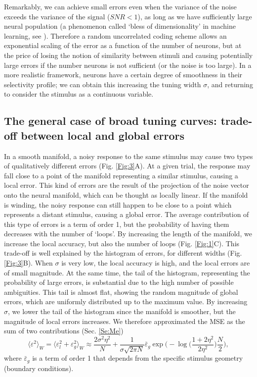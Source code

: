 \documentclass[a4paper]{article}
\begin{document}
Remarkably, we can achieve small errors even when the variance of the noise exceeds the variance of the signal ($SNR <1$), as long as we have sufficiently large neural population (a phenomenon called `bless of dimensionality' in machine learning, see \cite{Donoho2000High-dimensionalDimensionality}).
Therefore a random uncorrelated coding scheme  allows an exponential scaling of the error as a function of the number of neurons, but at the price of losing the notion of similarity between stimuli and causing potentially large errors if the number neurons is not sufficient (or the noise is too large). In a more realistic framework, neurons have a certain degree of smoothness in their selectivity profile; we can obtain this increasing the tuning width $\sigma$, and returning to consider the stimulus as a continuous variable.
\subsection{The general case of broad tuning curves: trade-off between local and global errors}



In a smooth manifold, a noisy response to the same stimulus may cause two types of qualitatively different errors (Fig. \ref{Fig:3}A). At a given trial, the response may fall close to a point of the manifold representing a similar stimulus, causing a local error. This kind of errors are the result of the projection of the noise vector onto the neural manifold, which can be thought as locally linear.  If the manifold is winding, the noisy response can still happen to be close to a point which represents a distant stimulus, causing a global error. The average contribution of this type of errors is a term of order 1, but the probability of having them decreases with the number of `loops'. By increasing the length of the manifold, we increase the local accuracy, but also the number of loops (Fig.  \ref{Fig:1}C). This trade-off is well explained by the histogram of errors, for different widths (Fig. \ref{Fig:3}B). When $\sigma$ is very low, the local accuracy is high, and the local errors are of small magnitude. At the same time, the tail of the histogram, representing the probability of large errors, is substantial due to the high number of possible ambiguities. 
This tail is almost flat, showing the random magnitude of global errors, which are uniformly distributed up to the maximum value. By increasing $\sigma$, we lower the tail of the histogram since the manifold is smoother, but the magnitude of local errors increases. We therefore approximated the MSE as the sum of two contributions (Sec. \ref{Se:Me})
\begin{equation}
\langle \varepsilon^2 \rangle_W=\langle \varepsilon_l^2 + \varepsilon_g^2\rangle_W \approx \frac{2\sigma^2 \eta^2}{N} + \frac{1}{\sigma \sqrt{2\pi N}}\bar{\varepsilon}_g \exp{\Big(- \log\big(\frac{1+2\eta^2}{2\eta^2}\big)\frac{N}{2}\Big)},
\label{Eq:LvsG}
\end{equation}
where $\bar{\varepsilon}_g$ is a term of order 1 that depends from the specific stimulus geometry (boundary conditions). 
 
\end{document}
